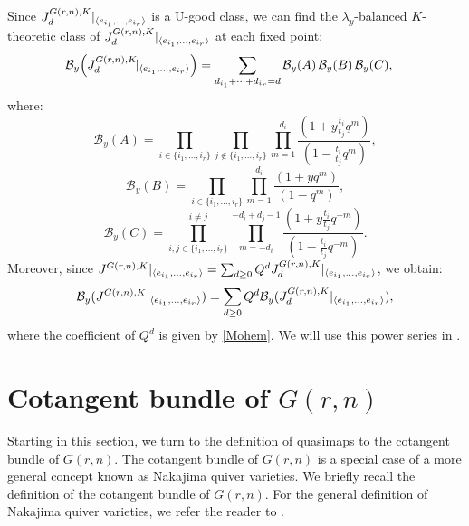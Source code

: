 \documentclass{amsart}
\begin{document}
Since ${J_d^{G(r,n),K}}\arrowvert_{\langle e_{i_1},\dots,e_{i_r}\rangle}$ is a U-good class, we can find the  $\lambda_y$-balanced $K$-theoretic class of ${J_d^{G(r,n),K}}\arrowvert_{\langle e_{i_1},\dots,e_{i_r}\rangle}$ at each fixed point:
\begin{align} \label{Mohem}
\mathcal{B}_y\!\left({J_d^{G(r,n),K}}\!\arrowvert_{\langle e_{i_1},\dots,e_{i_r}\rangle}\right)
&= \sum_{d_{i_1}+\dots+d_{i_r}=d}
\mathcal{B}_y(A)\,\mathcal{B}_y(B)\,\mathcal{B}_y(C),
\end{align}
where:
\[
\mathcal{B}_y(A) = \prod_{i \in \{i_1,\dots,i_r\}} \prod_{j \notin \{i_1,\dots,i_r\}}\prod_{m=1}^{d_i} \frac{(1+y{\frac{t_i}{t_j}}q^{m})}{(1-{\frac{t_i}{t_j}}q^{m})} ,
\]
\[
\mathcal{B}_y(B) = \prod_{i \in \{i_1,\dots,i_r\}}\prod_{m=1}^{d_i}\frac{(1+yq^{m})}{(1-q^{m})},
\]
\[
\mathcal{B}_y(C) = \prod_{i,j \in \{i_1,\dots,i_r\}}^{i \ne j}\prod_{m=-d_i}^{-d_i+d_j-1}\frac{(1+y{\frac{t_i}{t_j}}q^{-m})}{(1-{\frac{t_i}{t_j}}q^{-m})}.
\]
Moreover, since ${J^{G(r,n),K}}\arrowvert_{\langle e_{i_1},\dots,e_{i_r}\rangle} = \sum_{d \geq 0}Q^d{J_d^{G(r,n),K}}\arrowvert_{\langle e_{i_1},\dots,e_{i_r}\rangle}$, we obtain:
\[
\mathcal{B}_y({J^{G(r,n),K}}\arrowvert_{\langle e_{i_1}, \dots,e_{i_r}\rangle}) = \sum_{d \geq    0}Q^d\mathcal{B}_y({J_d^{G(r,n),K}}\arrowvert_{\langle e_{i_1}, \dots,e_{i_r}\rangle}),
\]
where the coefficient of $Q^d$ is given by \eqref{Mohem}. We will use this power series in .

\section{Cotangent bundle of \texorpdfstring{$G(r,n)$}{Gr(r,n)}}
Starting in this section, we turn to the definition of quasimaps to the cotangent bundle of $G(r,n)$. The cotangent bundle of $G(r,n)$ is a special case of a more general concept known as Nakajima quiver varieties. We briefly recall the definition of the cotangent bundle of $G(r,n)$. For the general definition of Nakajima quiver varieties, we refer the reader to \cite{MR3644099}.
\end{document}
